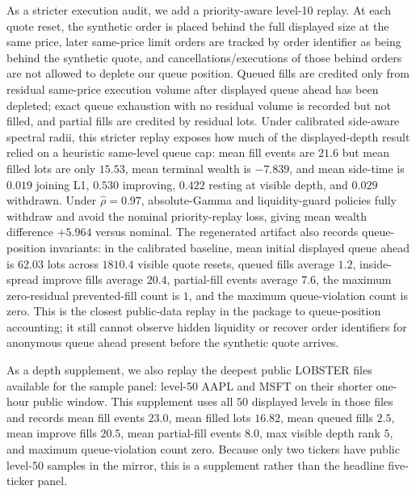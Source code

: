 \documentclass[11pt]{article}
\begin{document}
As a stricter execution audit, we add a priority-aware level-10 replay. At each
quote reset, the synthetic order is placed behind the full displayed size at
the same price, later same-price limit orders are tracked by order identifier
as being behind the synthetic quote, and cancellations/executions of those
behind orders are not allowed to deplete our queue position. Queued fills are
credited only from residual same-price execution volume after displayed queue
ahead has been depleted; exact queue exhaustion with no residual volume is
recorded but not filled, and partial fills are credited by residual lots. Under
calibrated side-aware spectral radii, this stricter replay exposes how much of
the displayed-depth result relied on a heuristic same-level queue cap: mean fill
events are $21.6$ but mean filled lots are only $15.53$, mean terminal wealth is
$-7.839$, and mean side-time is $0.019$ joining L1, $0.530$ improving,
$0.422$ resting at visible depth, and $0.029$ withdrawn. Under
$\hat\rho=0.97$, absolute-Gamma and liquidity-guard policies fully withdraw
and avoid the nominal priority-replay loss, giving mean wealth difference
$+5.964$ versus nominal. The regenerated artifact also records queue-position
invariants: in the calibrated baseline, mean initial displayed queue ahead is
$62.03$ lots across $1810.4$ visible quote resets, queued fills average $1.2$,
inside-spread improve fills average $20.4$, partial-fill events average $7.6$,
the maximum zero-residual prevented-fill count is $1$, and the maximum
queue-violation count is zero. This is the closest public-data replay in the
package to queue-position accounting; it still cannot observe hidden liquidity
or recover order identifiers for anonymous queue ahead present before the
synthetic quote arrives.

As a depth supplement, we also replay the deepest public LOBSTER files available
for the sample panel: level-50 AAPL and MSFT on their shorter one-hour public
window. This supplement uses all $50$ displayed levels in those files and
records mean fill events $23.0$, mean filled lots $16.82$, mean queued fills
$2.5$, mean improve fills $20.5$, mean partial-fill events $8.0$, max visible
depth rank $5$, and maximum queue-violation count zero. Because only two tickers
have public level-50 samples in the mirror, this is a supplement rather than the
headline five-ticker panel.
\end{document}
